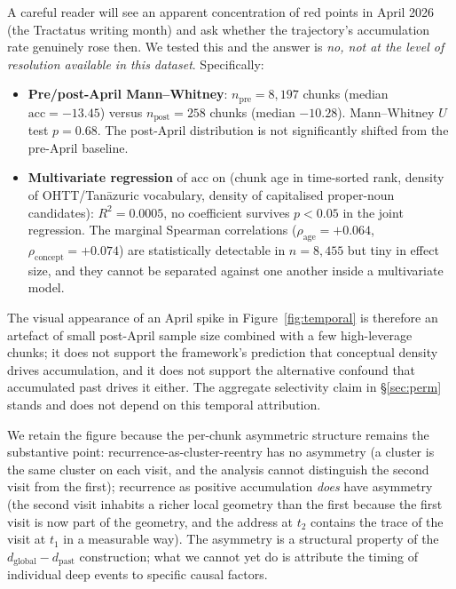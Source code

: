 \documentclass[11pt,a4paper]{article}
\theoremstyle{definition}
\newcommand{\dpast}{d_{\mathrm{past}}}
\newcommand{\dglobal}{d_{\mathrm{global}}}
\begin{document}
A careful reader will see an apparent concentration of red points in
April 2026 (the Tractatus writing month) and ask whether the
trajectory's accumulation rate genuinely rose then. We tested this
and the answer is \emph{no, not at the level of resolution available
in this dataset}. Specifically:

\begin{itemize}
\item \textbf{Pre/post-April Mann--Whitney}: $n_{\text{pre}} =
  8{,}197$ chunks (median $\mathrm{acc} = -13.45$) versus
  $n_{\text{post}} = 258$ chunks (median $-10.28$). Mann--Whitney
  $U$ test $p = 0.68$. The post-April distribution is
  not significantly shifted from the pre-April baseline.
\item \textbf{Multivariate regression} of $\mathrm{acc}$ on
  (chunk age in time-sorted rank, density of OHTT/Tan\=azuric
  vocabulary, density of capitalised proper-noun candidates):
  $R^2 = 0.0005$, no coefficient survives $p < 0.05$ in
  the joint regression. The marginal Spearman correlations
  ($\rho_{\text{age}} = +0.064$,
  $\rho_{\text{concept}} = +0.074$) are statistically detectable
  in $n=8{,}455$ but tiny in effect size, and they cannot be
  separated against one another inside a multivariate model.
\end{itemize}

The visual appearance of an April spike in
Figure~\ref{fig:temporal} is therefore an artefact of small post-April
sample size combined with a few high-leverage chunks; it does not
support the framework's prediction that conceptual density drives
accumulation, and it does not support the alternative confound that
accumulated past drives it either. The aggregate selectivity claim
in \S\ref{sec:perm} stands and does not depend on this temporal
attribution.

We retain the figure because the per-chunk asymmetric structure
remains the substantive point: recurrence-as-cluster-reentry has no
asymmetry (a cluster is the same cluster on each visit, and the
analysis cannot distinguish the second visit from the first);
recurrence as positive accumulation \emph{does} have asymmetry (the
second visit inhabits a richer local geometry than the first because
the first visit is now part of the geometry, and the address at
$t_2$ contains the trace of the visit at $t_1$ in a measurable way).
The asymmetry is a structural property of the $\dglobal - \dpast$
construction; what we cannot yet do is attribute the timing of
individual deep events to specific causal factors.
\end{document}
